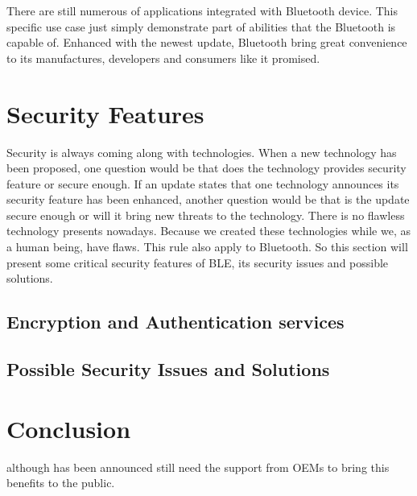 \documentclass{cseminar}
\begin{document}
There are still numerous of applications integrated with Bluetooth device. This specific use case just simply demonstrate part of abilities that the Bluetooth is capable of. Enhanced with the newest update, Bluetooth bring great convenience to its manufactures, developers and consumers like it promised.
\section{Security Features}
Security is always coming along with technologies. When a new technology has been proposed, one question would be that does the technology provides security feature or secure enough. If an update states that one technology announces its security feature has been enhanced, another question would be that is the update secure enough or will it bring new threats to the technology. There is no flawless technology presents nowadays. Because we created these technologies while we, as a human being, have flaws. This rule also apply to Bluetooth. So this section will present some critical security features of BLE, its security issues and possible solutions.
\subsection{Encryption and Authentication services}

\subsection{Possible Security Issues and Solutions}
\section{Conclusion}
although has been announced still need the support from OEMs to bring this benefits to the public.




\end{document}
